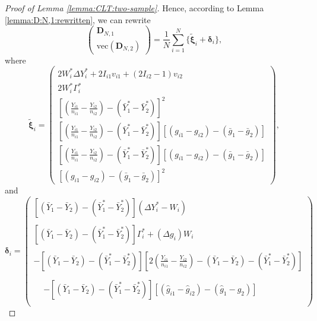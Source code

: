 \documentclass[12pt,letterpaper]{article}
\begin{document}
\begin{proof}[Proof of Lemma \ref{lemma:CLT:two-sample}]
Hence, according to Lemma \ref{lemma:D:N,1:rewritten}, we can rewrite 
\begin{equation}\label{eq:two-sample:D:rewrite}
\begin{pmatrix}
    \mathbf{D}_{N,1}\\
    \mathrm{vec}\left(\mathbf{D}_{N,2}\right)
\end{pmatrix}=\frac{1}{N}\sum_{i=1}^N\{\tilde{\boldsymbol{\xi}}_i+\boldsymbol{\delta}_i\},
\end{equation}
where  
\begin{equation}\label{eq:xi:two-sample:inid}
    \tilde{\boldsymbol{\xi}}_i=\begin{pmatrix}
        \displaystyle 2W_i^*\Delta Y_i^*+2I_{i1}v_{i1}+(2I_{i2}-1)v_{i2}\\
        \displaystyle 2W_i^*\Gamma_i^*\\
        \displaystyle\left[\left(\frac{Y_{i1}}{n_{i1}}-\frac{Y_{i2}}{n_{i2}}\right)-(\bar{Y}_1^*-\bar{Y}_2^*)\right]^2\\
        \displaystyle\left[\left(\frac{Y_{i1}}{n_{i1}}-\frac{Y_{i2}}{n_{i2}}\right)-(\bar{Y}_1^*-\bar{Y}_2^*)\right][(g_{i1}-g_{i2})-(\bar{g}_1-\bar{g}_2)]\\
        \displaystyle\left[\left(\frac{Y_{i1}}{n_{i1}}-\frac{Y_{i2}}{n_{i2}}\right)-(\bar{Y}_1^*-\bar{Y}_2^*)\right][(g_{i1}-g_{i2})-(\bar{g}_1-\bar{g}_2)]\\
        \displaystyle[(g_{i1}-g_{i2})-(\bar{g}_1-\bar{g}_2)]^2
    \end{pmatrix},
\end{equation}
and 
\begin{equation}\label{eq:delta:two-sample:remain}
    \boldsymbol{\delta}_i=\begin{pmatrix}
        [(\bar{Y}_1-\bar{Y}_2)-(\bar{Y}_1^*-\bar{Y}_2^*)](\Delta Y_i^*-W_i)\\
        \\
        [(\bar{Y}_1-\bar{Y}_2)-(\bar{Y}_1^*-\bar{Y}_2^*)]\Gamma_i^*+(\Delta g_i)W_i\\
        \\
        \displaystyle-[(\bar{Y}_1-\bar{Y}_2)-(\bar{Y}_1^*-\bar{Y}_2^*)]\left[2\left(\frac{Y_{i1}}{n_{i1}}-\frac{Y_{i2}}{n_{i2}}\right)-(\bar{Y}_1-\bar{Y}_2)-(\bar{Y}_1^*-\bar{Y}_2^*)\right]\\
        \\
        \begin{array}{rl}
        &\displaystyle-[(\bar{Y}_1-\bar{Y}_2)-(\bar{Y}_1^*-\bar{Y}_2^*)][(\hat{g}_{i1}-\hat{g}_{i2})-(\hat{g}_1-\hat{g}_2)]\\

\end{array}
\end{pmatrix}
\end{equation}
\end{proof}
\end{document}
